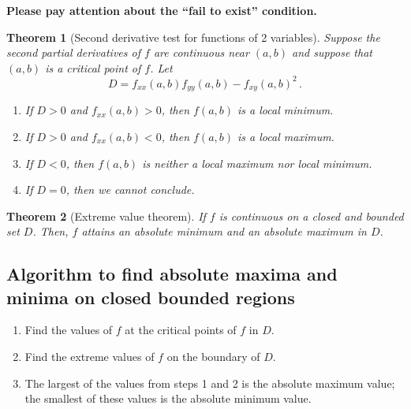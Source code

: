\documentclass[
]{book}
\newtheorem{theorem}{Theorem}[chapter]
\theoremstyle{definition}
\theoremstyle{definition}
\theoremstyle{definition}
\theoremstyle{definition}
\theoremstyle{remark}
\begin{document}
\textbf{Please pay attention about the ``fail to exist'' condition.}

\begin{theorem}[Second derivative test for functions of 2 variables]

Suppose the second partial derivatives of \(f\) are continuous near \((a,b)\)
and suppose that \((a,b)\) is a critical point of \(f\).
Let
\begin{equation*}
    D = f_{xx}(a,b) f_{yy}(a,b) - f_{xy}(a,b)^2\,.
\end{equation*}

\begin{enumerate}
\def\labelenumi{\arabic{enumi}.}
\item
  If \(D>0\) and \(f_{xx}(a,b) >0\), then \(f(a,b)\) is a local minimum.
\item
  If \(D>0\) and \(f_{xx}(a,b) <0\), then \(f(a,b)\) is a local maximum.
\item
  If \(D<0\), then \(f(a,b)\) is neither a local maximum nor local minimum.
\item
  If \(D=0\), then we cannot conclude.
\end{enumerate}

\end{theorem}

\begin{theorem}[Extreme value theorem]
If \(f\) is continuous on a \emph{closed} and \emph{bounded} set \(D\). Then,
\(f\) attains an absolute minimum and an absolute maximum in \(D\).
\end{theorem}

\hypertarget{algorithm-to-find-absolute-maxima-and-minima-on-closed-bounded-regions}{%
\subsection{Algorithm to find absolute maxima and minima on closed bounded regions}\label{algorithm-to-find-absolute-maxima-and-minima-on-closed-bounded-regions}}

\begin{enumerate}
\def\labelenumi{\arabic{enumi}.}
\item
  Find the values of \(f\) at the critical points of \(f\) in \(D\).
\item
  Find the extreme values of \(f\) on the boundary of \(D\).
\item
  The largest of the values from steps 1 and 2 is the absolute maximum value;
  the smallest of these values is the absolute minimum value.
\end{enumerate}
\end{document}
